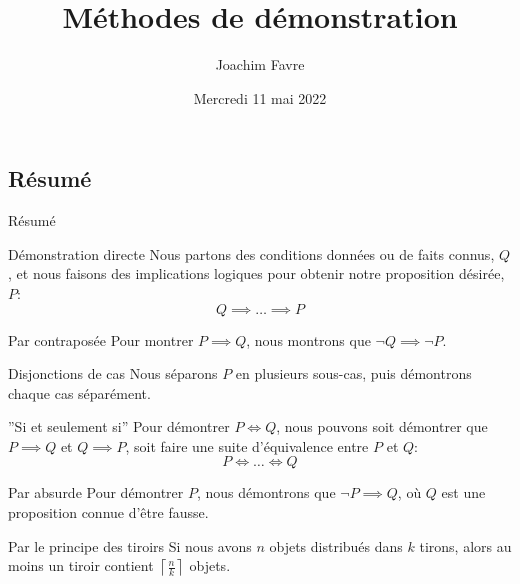 \documentclass[a4paper]{article}
\title{Méthodes de démonstration}
\author{Joachim Favre}
\date{Mercredi 11 mai 2022}
\begin{document}
\maketitle


\subsection{Résumé}
\begin{parag}{Résumé}
    \begin{subparag}{Démonstration directe}
        Nous partons des conditions données ou de faits connus, $Q$, et nous faisons des implications logiques pour obtenir notre proposition désirée, $P$: 
        \[Q \implies \ldots \implies P\]
    \end{subparag}

    \begin{subparag}{Par contraposée}
        Pour montrer $P \implies Q$, nous montrons que $\lnot Q \implies \lnot P$.
    \end{subparag}

    \begin{subparag}{Disjonctions de cas}
        Nous séparons $P$ en plusieurs sous-cas, puis démontrons chaque cas séparément.
    \end{subparag}
    
    \begin{subparag}{''Si et seulement si''}
        Pour démontrer $P \iff Q$, nous pouvons soit démontrer que $P\implies Q$ et $Q \implies P$, soit faire une suite d'équivalence entre $P$ et $Q$: 
        \[P \iff \ldots \iff Q\]
    \end{subparag}
    
    \begin{subparag}{Par absurde}
        Pour démontrer $P$, nous démontrons que $\lnot P \implies Q$, où $Q$ est une proposition connue d'être fausse.
    \end{subparag}

    \begin{subparag}{Par le principe des tiroirs}
        Si nous avons $n$ objets distribués dans $k$ tirons, alors au moins un tiroir contient $\left\lceil \frac{n}{k} \right\rceil $ objets.
    \end{subparag}


\end{parag}
\end{document}
